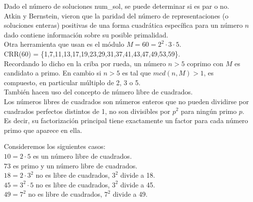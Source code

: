 Dado el número de soluciones num\_sol, se puede determinar si es par o no. \\

Atkin y Bernstein, vieron que la paridad del número de representaciones (o soluciones enteras) positivas de una forma cuadrática específica para un número $n$ dado contiene información sobre su posible primalidad. \\

Otra herramienta que usan es el módulo $M = 60 =
2^2 \cdot 3 \cdot 5$. \\
CRR(60) = \{1,7,11,13,17,19,23,29,31,37,41,43,47,49,53,59\}. \\
Recordando lo dicho en la criba por rueda, un número $n > 5$
coprimo con $M$ es candidato a primo. En cambio si $n > 5$ es
tal que $mcd(n,M) > 1$, es compuesto, en particular múltiplo de 2,
3 o 5. \\

También hacen uso del concepto de número libre de cuadrados. \\
Los números libres de cuadrados son números enteros que no pueden
dividirse por cuadrados perfectos distintos de 1, no son divisibles por $p^2$ para ningún primo $p$. \\
Es decir, su factorización principal tiene exactamente un factor para cada número primo que aparece en ella.

\begin{ejemplo}
Consideremos los siguientes casos: \\
$10 = 2 \cdot 5$ es un número libre de cuadrados. \\
$73$ es primo y un número libre de cuadrados. \\
$18 = 2 \cdot 3^2$ no es libre de cuadrados, $3^2$ divide a 18. \\
$45 = 3^2 \cdot 5$ no es libre de cuadrados, $3^2$ divide a 45. \\
$49 = 7^2$ no es libre de cuadrados, $7^2$ divide a 49. \\
\end{ejemplo}

